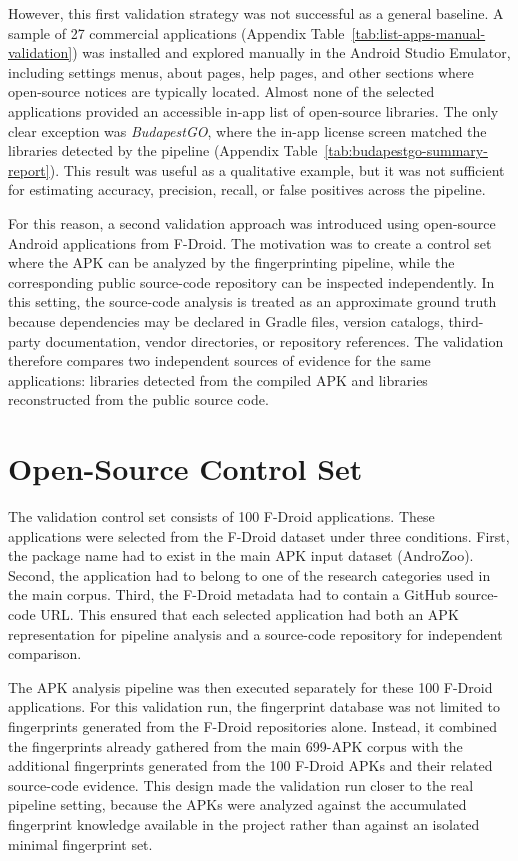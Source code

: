 \documentclass[12pt,a4paper]{report}
\begin{document}
However, this first validation strategy was not successful as a general baseline. A sample of 27 commercial applications (Appendix Table~\ref{tab:list-apps-manual-validation}) was installed and explored manually in the Android Studio Emulator, including settings menus, about pages, help pages, and other sections where open-source notices are typically located. Almost none of the selected applications provided an accessible in-app list of open-source libraries. The only clear exception was \textit{BudapestGO}, where the in-app license screen matched the libraries detected by the pipeline (Appendix Table~\ref{tab:budapestgo-summary-report}). This result was useful as a qualitative example, but it was not sufficient for estimating accuracy, precision, recall, or false positives across the pipeline.

For this reason, a second validation approach was introduced using open-source Android applications from F-Droid. The motivation was to create a control set where the APK can be analyzed by the fingerprinting pipeline, while the corresponding public source-code repository can be inspected independently. In this setting, the source-code analysis is treated as an approximate ground truth because dependencies may be declared in Gradle files, version catalogs, third-party documentation, vendor directories, or repository references. The validation therefore compares two independent sources of evidence for the same applications: libraries detected from the compiled APK and libraries reconstructed from the public source code.

\section{Open-Source Control Set}
The validation control set consists of 100 F-Droid applications. These applications were selected from the F-Droid dataset under three conditions. First, the package name had to exist in the main APK input dataset (AndroZoo). Second, the application had to belong to one of the research categories used in the main corpus. Third, the F-Droid metadata had to contain a GitHub source-code URL. This ensured that each selected application had both an APK representation for pipeline analysis and a source-code repository for independent comparison.

The APK analysis pipeline was then executed separately for these 100 F-Droid applications. For this validation run, the fingerprint database was not limited to fingerprints generated from the F-Droid repositories alone. Instead, it combined the fingerprints already gathered from the main 699-APK corpus with the additional fingerprints generated from the 100 F-Droid APKs and their related source-code evidence. This design made the validation run closer to the real pipeline setting, because the APKs were analyzed against the accumulated fingerprint knowledge available in the project rather than against an isolated minimal fingerprint set.
\end{document}
